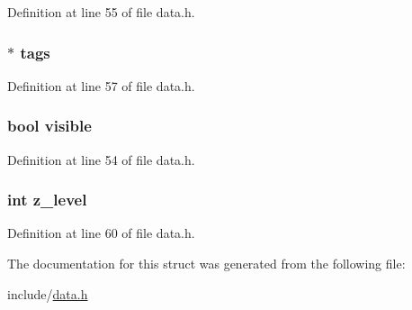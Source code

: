 Definition at line 55 of file data.\+h.

\subsubsection[{\texorpdfstring{tags}{tags}}]{$\ast$ tags}\hypertarget{struct_way_a5b3cb60eeefcbc271683754bf243aebb}{}\label{struct_way_a5b3cb60eeefcbc271683754bf243aebb}


Definition at line 57 of file data.\+h.

\subsubsection[{\texorpdfstring{visible}{visible}}]{\setlength{\rightskip}{0pt plus 5cm}bool visible}\hypertarget{struct_way_aa54a57ae048476d840caf6d4d2c47aa3}{}\label{struct_way_aa54a57ae048476d840caf6d4d2c47aa3}


Definition at line 54 of file data.\+h.

\subsubsection[{\texorpdfstring{z\+\_\+level}{z_level}}]{\setlength{\rightskip}{0pt plus 5cm}int z\+\_\+level}\hypertarget{struct_way_a683100657070e5df2de8d2c6398f7394}{}\label{struct_way_a683100657070e5df2de8d2c6398f7394}


Definition at line 60 of file data.\+h.



The documentation for this struct was generated from the following file\+:\begin{DoxyCompactItemize}
\item 
include/\hyperlink{data_8h}{data.\+h}\end{DoxyCompactItemize}
